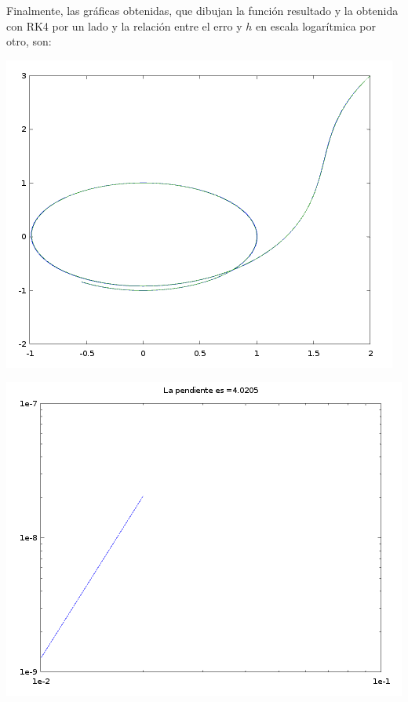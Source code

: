 Finalmente, las gráficas obtenidas, que dibujan la función resultado y la obtenida con RK4 por un lado y la relación entre el erro y $h$ en escala logarítmica por otro, son:
\begin{center}
    \begin{minipage}{0.49\textwidth}
        \centering
        \includegraphics[width=\textwidth]{img/RK4_implicito_grafica.png}
    \end{minipage}
    \begin{minipage}{.49\textwidth}
        \centering
        \includegraphics[width=\textwidth]{img/RK4_implicito_pendiente.png}
    \end{minipage}
\end{center}


